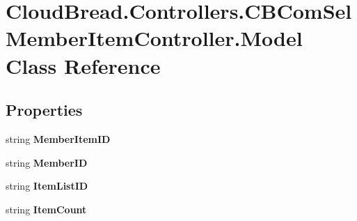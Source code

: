 \hypertarget{class_cloud_bread_1_1_controllers_1_1_c_b_com_sel_member_item_controller_1_1_model}{}\section{Cloud\+Bread.\+Controllers.\+C\+B\+Com\+Sel\+Member\+Item\+Controller.\+Model Class Reference}
\label{class_cloud_bread_1_1_controllers_1_1_c_b_com_sel_member_item_controller_1_1_model}
\subsection*{Properties}
\begin{DoxyCompactItemize}
\item 
string {\bfseries Member\+Item\+ID}\hypertarget{class_cloud_bread_1_1_controllers_1_1_c_b_com_sel_member_item_controller_1_1_model_a015ecaa641ca7c26e3cf366efa8d6940}{}\label{class_cloud_bread_1_1_controllers_1_1_c_b_com_sel_member_item_controller_1_1_model_a015ecaa641ca7c26e3cf366efa8d6940}

\item 
string {\bfseries Member\+ID}\hypertarget{class_cloud_bread_1_1_controllers_1_1_c_b_com_sel_member_item_controller_1_1_model_a77175886d64c1b0ea1245957dbf435f2}{}\label{class_cloud_bread_1_1_controllers_1_1_c_b_com_sel_member_item_controller_1_1_model_a77175886d64c1b0ea1245957dbf435f2}

\item 
string {\bfseries Item\+List\+ID}\hypertarget{class_cloud_bread_1_1_controllers_1_1_c_b_com_sel_member_item_controller_1_1_model_ab4a8af0e951d0ee26d5dbc98aac94f31}{}\label{class_cloud_bread_1_1_controllers_1_1_c_b_com_sel_member_item_controller_1_1_model_ab4a8af0e951d0ee26d5dbc98aac94f31}

\item 
string {\bfseries Item\+Count}\hypertarget{class_cloud_bread_1_1_controllers_1_1_c_b_com_sel_member_item_controller_1_1_model_a660411a10024b82697be0ea8b081e237}{}\label{class_cloud_bread_1_1_controllers_1_1_c_b_com_sel_member_item_controller_1_1_model_a660411a10024b82697be0ea8b081e237}


\end{DoxyCompactItemize}
